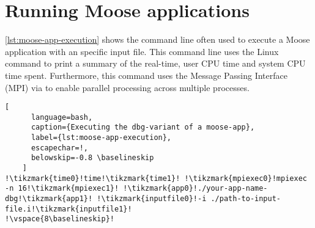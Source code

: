 \section{Running Moose applications}
\label{chap:patterns-running-moose}

\autoref{lst:moose-app-execution} shows the command line often used to execute
a Moose application with an specific input file. This command line uses the
Linux  command to print a summary of the real-time, user CPU
time and system CPU time spent. Furthermore, this command uses the Message
Passing Interface (MPI) via  to enable parallel processing
across multiple processes.

\begin{lstlisting}[
      language=bash, 
      caption={Executing the dbg-variant of a moose-app},
      label={lst:moose-app-execution},
      escapechar=!,
      belowskip=-0.8 \baselineskip
    ]
!\tikzmark{time0}!time!\tikzmark{time1}! !\tikzmark{mpiexec0}!mpiexec -n 16!\tikzmark{mpiexec1}! !\tikzmark{app0}!./your-app-name-dbg!\tikzmark{app1}! !\tikzmark{inputfile0}!-i ./path-to-input-file.i!\tikzmark{inputfile1}!
!\vspace{8\baselineskip}!
\end{lstlisting}%
